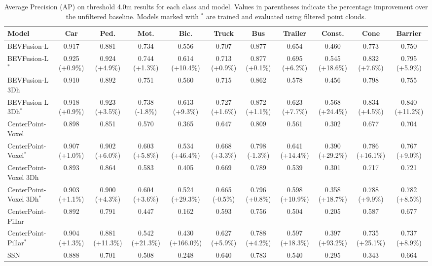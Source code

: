 
\begin{table}[htpb]
    \caption{Average Precision (AP) on threshold 4.0m results for each class and model. Values in parentheses indicate the percentage improvement over the unfiltered baseline. Models marked with $^*$ are trained and evaluated using filtered point clouds.}
    \centering
    \begin{tabular}{lcccccccccc}
    \midrule
    Model & Car & Ped. & Mot. & Bic. & Truck & Bus & Trailer & Const. & Cone & Barrier \\
    \midrule
    BEVFusion-L & 0.917 & 0.881 & 0.734 & 0.556 & 0.707 & 0.877 & 0.654 & 0.460 & 0.773 & 0.750 \\
    BEVFusion-L$^*$ & 0.925 (+0.9\%) & 0.924 (+4.9\%) & 0.744 (+1.3\%) & 0.614 (+10.4\%) & 0.713 (+0.9\%) & 0.877 (+0.1\%) & 0.695 (+6.2\%) & 0.545 (+18.6\%) & 0.832 (+7.6\%) & 0.795 (+5.9\%) \\
    \midrule
    BEVFusion-L 3Dh & 0.910 & 0.892 & 0.751 & 0.560 & 0.715 & 0.862 & 0.578 & 0.456 & 0.798 & 0.755 \\
    BEVFusion-L 3Dh$^*$ & 0.918 (+0.9\%) & 0.923 (+3.5\%) & 0.738 (-1.8\%) & 0.613 (+9.3\%) & 0.727 (+1.6\%) & 0.872 (+1.1\%) & 0.623 (+7.7\%) & 0.568 (+24.4\%) & 0.834 (+4.5\%) & 0.840 (+11.2\%) \\
    \midrule
    CenterPoint-Voxel & 0.898 & 0.851 & 0.570 & 0.365 & 0.647 & 0.809 & 0.561 & 0.302 & 0.677 & 0.704 \\
    CenterPoint-Voxel$^*$ & 0.907 (+1.0\%) & 0.902 (+6.0\%) & 0.603 (+5.8\%) & 0.534 (+46.4\%) & 0.668 (+3.3\%) & 0.798 (-1.3\%) & 0.641 (+14.4\%) & 0.390 (+29.2\%) & 0.786 (+16.1\%) & 0.767 (+9.0\%) \\
    \midrule
    CenterPoint-Voxel 3Dh & 0.893 & 0.864 & 0.583 & 0.405 & 0.669 & 0.789 & 0.539 & 0.301 & 0.717 & 0.721 \\
    CenterPoint-Voxel 3Dh$^*$ & 0.903 (+1.1\%) & 0.900 (+4.3\%) & 0.604 (+3.6\%) & 0.524 (+29.3\%) & 0.665 (-0.5\%) & 0.796 (+0.8\%) & 0.598 (+10.9\%) & 0.358 (+18.7\%) & 0.788 (+9.9\%) & 0.782 (+8.5\%) \\
    \midrule
    CenterPoint-Pillar & 0.892 & 0.791 & 0.447 & 0.162 & 0.593 & 0.756 & 0.504 & 0.205 & 0.587 & 0.677 \\
    CenterPoint-Pillar$^*$ & 0.904 (+1.3\%) & 0.881 (+11.3\%) & 0.542 (+21.3\%) & 0.430 (+166.0\%) & 0.627 (+5.9\%) & 0.788 (+4.2\%) & 0.597 (+18.3\%) & 0.397 (+93.2\%) & 0.735 (+25.1\%) & 0.737 (+8.9\%) \\
    \midrule
    SSN & 0.888 & 0.701 & 0.508 & 0.248 & 0.640 & 0.783 & 0.540 & 0.295 & 0.343 & 0.664 \\

\end{tabular}
\end{table}
